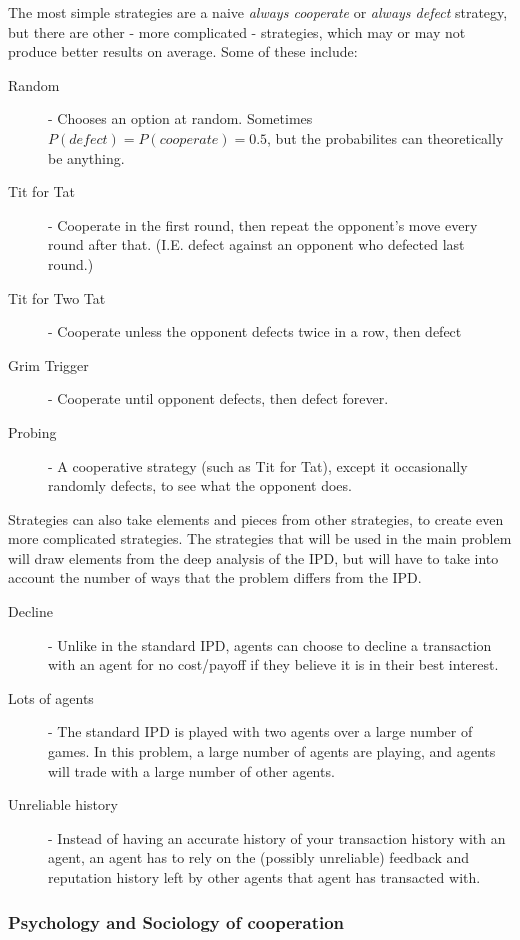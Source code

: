 \documentclass{article}
\begin{document}
The most simple strategies are a naive \emph{always cooperate} or \emph{always defect} strategy, but there are other - more complicated - strategies, which may or may not produce better results on average. Some of these include:
\begin{description}
	\item[Random] - Chooses an option at random. Sometimes $P(defect) = P(cooperate) = 0.5$, but the probabilites can theoretically be anything.
	\item[Tit for Tat] - Cooperate in the first round, then repeat the opponent's move every round after that. (I.E. defect against an opponent who defected last round.)
	\item[Tit for Two Tat] - Cooperate unless the opponent defects twice in a row, then defect
	\item[Grim Trigger] - Cooperate until opponent defects, then defect forever.
	\item[Probing] - A cooperative strategy (such as Tit for Tat), except it occasionally randomly defects, to see what the opponent does.
\end{description}

Strategies can also take elements and pieces from other strategies, to create even more complicated strategies. The strategies that will be used in the main problem will draw elements from the deep analysis of the IPD, but will have to take into account the number of ways that the problem differs from the IPD.

\begin{description}
	\item[Decline] - Unlike in the standard IPD, agents can choose to decline a transaction with an agent for no cost/payoff if they believe it is in their best interest.
	\item[Lots of agents] - The standard IPD is played with two agents over a large number of games. In this problem, a large number of agents are playing, and agents will trade with a large number of other agents.
	\item[Unreliable history] - Instead of having an accurate history of your transaction history with an agent, an agent has to rely on the (possibly unreliable) feedback and reputation history left by other agents that agent has transacted with.
\end{description}

\subsubsection{Psychology and Sociology of cooperation}
\label{sec:psychology-sociology-cooperation}
\end{document}
